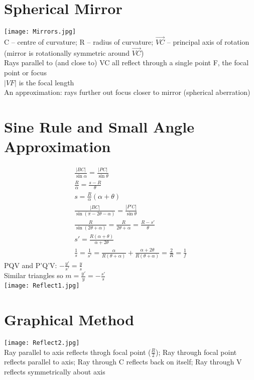 \documentclass[a4paper, 11pt, fleqn, normalem]{report}
\begin{document}
\section{Spherical Mirror}
\texttt{[image: Mirrors.jpg]} \\
C -- centre of curvature; R -- radius of curvature; $\overrightarrow{VC}$ -- principal axis of rotation (mirror is rotationally symmetric around $\overrightarrow{VC}$) \\
Rays parallel to (and close to) VC all reflect through a single point F, the focal point or focus \\
$|VF|$ is the focal length \\
An approximation: rays further out focus closer to mirror (spherical aberration)

\section{Sine Rule and Small Angle Approximation}
\vspace{-18pt}
\begin{gather*}
    \frac{|BC|}{\sin{\alpha}} = \frac{|PC|}{\sin{\theta}} \\
    \frac{R}{\alpha} = \frac{s - R}{\theta} \\
    s = \frac{R}{\alpha}(\alpha + \theta) \\
    \frac{|BC|}{\sin{(\pi - 2\theta - \alpha)}} = \frac{|P'C|}{\sin{\theta}}\\
    \frac{R}{\sin{(2\theta + \alpha)}} = \frac{R}{2\theta + \alpha} = \frac{R - s'}{\theta} \\
    s' = \frac{R(\alpha + \theta)}{\alpha + 2\theta} \\
    \frac{1}{s} = \frac{1}{s'} = \frac{\alpha}{R(\theta + \alpha)} + \frac{\alpha + 2\theta}{R(\theta + \alpha)} = \frac{2}{R} = \frac{1}{f}
\end{gather*}
PQV and P'Q'V: $-\frac{y'}{s'} = \frac{y}{s}$ \\
Similar triangles so $m = \frac{y'}{y} = -\frac{s'}{s}$ \\
\texttt{[image: Reflect1.jpg]}

\section{Graphical Method}
\texttt{[image: Reflect2.jpg]} \\
Ray parallel to axis reflects throgh focal point ($\frac{R}{2}$); Ray through focal point reflects parallel to axis; Ray through C reflects back on itself; Ray through V reflects symmetrically about axis
\end{document}
